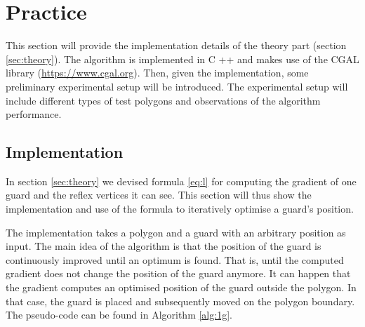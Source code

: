 \section{Practice}
\label{sec:experiments}

This section will provide the implementation details of the theory part (section \ref{sec:theory}). The algorithm is implemented in C ++ and makes use of the CGAL library (\url{https://www.cgal.org}). Then, given the implementation, some preliminary experimental setup will be introduced. The experimental setup will include different types of test polygons and observations of the algorithm performance.
\subsection{Implementation}
In section \ref{sec:theory} we devised formula \ref{eq:l} for computing the gradient of one guard and the reflex vertices it can see. This section will thus show the implementation and use of the formula to iteratively optimise a guard's position. 

The implementation takes a polygon and a guard with an arbitrary position as input. The main idea of the algorithm is that the position of the guard is continuously improved until an optimum is found. That is, until the computed gradient does not change the position of the guard anymore.
It can happen that the gradient computes an optimised position of the guard outside the polygon. In that case, the guard is placed and subsequently moved on the polygon boundary. The pseudo-code can be found in Algorithm \ref{alg:1g}.

